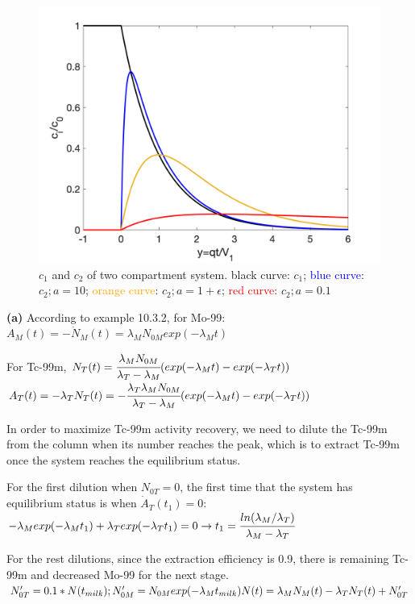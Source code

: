 \documentclass[12pt,a4paper]{article}
\begin{document}
\begin{figure}[!ht]
    \centering
    \includegraphics[width=\textwidth]{hw10_2.png}
    \caption{$c_1$ and $c_2$ of two compartment system. black curve: $c_1$; \textcolor{blue}{blue curve}: $c_2;a=10$; \textcolor{orange}{orange curve}: $c_2;a=1+\epsilon$; \textcolor{red}{red curve}: $c_2;a=0.1$}
\end{figure}

\clearpage
{}
\textbf{(a)} According to example 10.3.2, for Mo-99:\\
$A_M(t)=-\dot{N}_M(t)=\lambda_MN_{0M}exp(-\lambda_Mt)$

For Tc-99m, $N_T(t)=\cfrac{\lambda_MN_{0M}}{\lambda_T-\lambda_M}(exp(-\lambda_Mt)-exp(-\lambda_Tt))$ \\
$A_T(t)=-\lambda_TN_T(t)=-\cfrac{\lambda_T\lambda_MN_{0M}}{\lambda_T-\lambda_M}(exp(-\lambda_Mt)-exp(-\lambda_Tt))$

In order to maximize Tc-99m activity recovery, we need to dilute the Tc-99m from the column when its number reaches the peak, which is to extract Tc-99m once the system reaches the equilibrium status. 

For the first dilution when $N_{0T}=0$, the first time that the system has equilibrium status is when $\dot{A}_T(t_1)=0$:\\ 
$-\lambda_Mexp(-\lambda_Mt_1)+\lambda_Texp(-\lambda_Tt_1)=0\rightarrow t_1=\cfrac{ln(\lambda_M/\lambda_T)}{\lambda_M-\lambda_T}$

For the rest dilutions, since the extraction efficiency is 0.9, there is remaining Tc-99m and decreased Mo-99 for the next stage. \\
$N'_{0T}=0.1*N(t_{milk});N'_{0M}=N_{0M}exp(-\lambda_Mt_{milk})\\
 N(t)=\lambda_MN_M(t)-\lambda_T N_T(t)+N'_{0T}$
\end{document}

